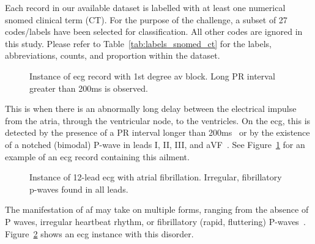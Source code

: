 \documentclass[\main/thesis.tex]{subfiles}
\begin{document}
Each record in our available dataset is labelled with at least one numerical \gls{snomed} clinical term (CT).
For the purpose of the challenge, a subset of 27 codes/labels have been selected for classification.
All other codes are ignored in this study.
Please refer to Table~\ref{tab:labels_snomed_ct} for the labels, abbreviations, counts, and proportion within the dataset.

\begin{description}

    \begin{figure}[ht]
        \centering
        \caption{Instance of \gls{ecg} record with 1st degree av block. Long PR interval greater than 200ms is observed.}
        \label{fig:full_IAVB}
    \end{figure}
    \item[\gls{iavb}] This is when there is an abnormally long delay between the electrical impulse from the atria, through the ventricular node, to the ventricles. On the \gls{ecg}, this is detected by the presence of a PR interval longer than 200ms~\cite{carroz_pseudo-pacemaker_2010} or by the existence of a notched (bimodal) P-wave in leads I, II, III, and aVF~\cite{bayes_de_luna_diagnosis_2017}. See Figure~\ref{fig:full_IAVB} for an example of an \gls{ecg} record containing this ailment.

    \begin{figure}[ht]
        \centering
        \caption{Instance of 12-lead \gls{ecg} with atrial fibrillation. Irregular, fibrillatory p-waves found in all leads.}
        \label{fig:full_AF}
    \end{figure}
    \item[\gls{af}] The manifestation of \gls{af} may take on multiple forms, ranging from the absence of P waves, irregular heartbeat rhythm, or fibrillatory (rapid, fluttering) P-waves~\cite{podrid2001cardiac,afib-ecg}. Figure~\ref{fig:full_AF} shows an \gls{ecg} instance with this disorder.


\end{description}
\end{document}
